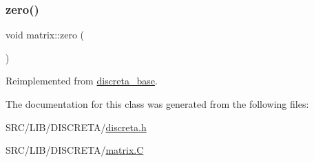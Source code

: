 \mbox{\label{classmatrix_abd2e274d4905bc97eabf7c72d5e66b3d}} 
\subsubsection{\texorpdfstring{zero()}{zero()}}
{\footnotesize\ttfamily void matrix\+::zero (\begin{DoxyParamCaption}{ }\end{DoxyParamCaption})\hspace{0.3cm}{\ttfamily [virtual]}}



Reimplemented from \mbox{\hyperlink{classdiscreta__base_a424aa44bbb6ca48d30ad1087dbd6f210}{discreta\+\_\+base}}.



The documentation for this class was generated from the following files\+:\begin{DoxyCompactItemize}
\item 
S\+R\+C/\+L\+I\+B/\+D\+I\+S\+C\+R\+E\+T\+A/\mbox{\hyperlink{discreta_8h}{discreta.\+h}}\item 
S\+R\+C/\+L\+I\+B/\+D\+I\+S\+C\+R\+E\+T\+A/\mbox{\hyperlink{matrix_8_c}{matrix.\+C}}\end{DoxyCompactItemize}
